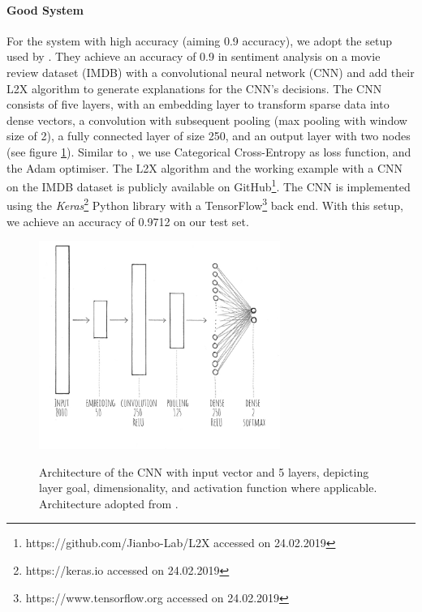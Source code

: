 \paragraph{Good System}
For the system with high accuracy (aiming 0.9 accuracy), we adopt the setup used by \cite{chen2018learning}. They achieve an accuracy of 0.9 in sentiment analysis on a movie review dataset (IMDB) with a convolutional neural network (CNN) and add their L2X algorithm to generate explanations for the CNN's decisions. The CNN consists of five layers, with an embedding layer to transform sparse data into dense vectors, a convolution with subsequent pooling (max pooling with window size of 2), a fully connected layer of size 250, and an output layer with two nodes (see figure \ref{fig:impl_cnn}). Similar to \cite{chen2012detecting}, we use Categorical Cross-Entropy as loss function, and the Adam optimiser. The L2X algorithm and the working example with a CNN on the IMDB dataset is publicly available on GitHub\footnote{https://github.com/Jianbo-Lab/L2X accessed on 24.02.2019}. The CNN is implemented using the \textit{Keras}\footnote{https://keras.io accessed on 24.02.2019} Python library with a TensorFlow\footnote{https://www.tensorflow.org accessed on 24.02.2019} back end. With this setup, we achieve an accuracy of 0.9712 on our test set. 
\begin{figure} [!ht]
	\centering
	\includegraphics[width=0.7\textwidth]{img/impl_cnn.JPG}\\
	\caption{Architecture of the CNN with input vector and 5 layers, depicting layer goal, dimensionality, and activation function where applicable. Architecture adopted from \cite{chen2018learning}.}
	\label{fig:impl_cnn}
\end{figure}

